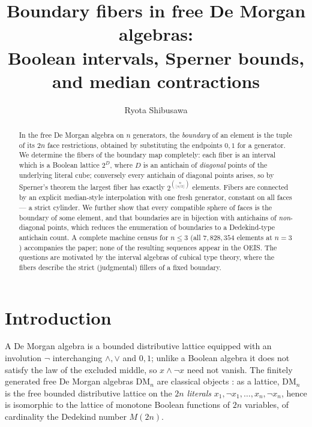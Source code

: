 \documentclass[11pt]{amsart}
\theoremstyle{definition}
\newcommand{\DM}{\mathrm{DM}}
\begin{document}
\title[Boundary fibers in free De Morgan algebras]{Boundary fibers in
  free De Morgan algebras:\\ Boolean intervals, Sperner bounds, and
  median contractions}

\author{Ryota Shibusawa}
\address{Daiichi Institute of Technology, Japan}


\begin{abstract}
  In the free De Morgan algebra on $n$ generators, the
  \emph{boundary} of an element is the tuple of its $2n$ face
  restrictions, obtained by substituting the endpoints $0,1$ for a
  generator.  We determine the fibers of the boundary map completely:
  each fiber is an interval which is a Boolean lattice $2^{D}$, where
  $D$ is an antichain of \emph{diagonal} points of the underlying
  literal cube; conversely every antichain of diagonal points arises,
  so by Sperner's theorem the largest fiber has exactly
  $2^{\binom{n}{\lfloor n/2\rfloor}}$ elements.  Fibers are connected
  by an explicit median-style interpolation with one fresh generator,
  constant on all faces --- a strict cylinder.  We further show that
  every compatible sphere of faces is the boundary of some element,
  and that boundaries are in bijection with antichains of
  \emph{non}-diagonal points, which reduces the enumeration of
  boundaries to a Dedekind-type antichain count.  A complete machine
  census for $n \le 3$ (all $7{,}828{,}354$ elements at $n = 3$)
  accompanies the paper; none of the resulting sequences appear in
  the OEIS.  The questions are motivated by the interval algebras of
  cubical type theory, where the fibers describe the strict
  (judgmental) fillers of a fixed boundary.
\end{abstract}

\maketitle

\section{Introduction}
\label{sec:intro}

A De Morgan algebra is a bounded distributive lattice equipped with
an involution $\neg$ interchanging $\wedge,\vee$ and $0,1$; unlike a
Boolean algebra it does not satisfy the law of the excluded middle,
so $x \wedge \neg x$ need not vanish.  The finitely generated free De
Morgan algebras $\DM_n$ are classical objects
\cite{BalbesDwinger,GWW,MA,MAfree}: as a lattice, $\DM_n$ is the free
bounded distributive lattice on the $2n$ \emph{literals}
$x_1, \neg x_1, \dots, x_n, \neg x_n$, hence is isomorphic to the
lattice of monotone Boolean functions of $2n$ variables, of
cardinality the Dedekind number $M(2n)$.
\end{document}
